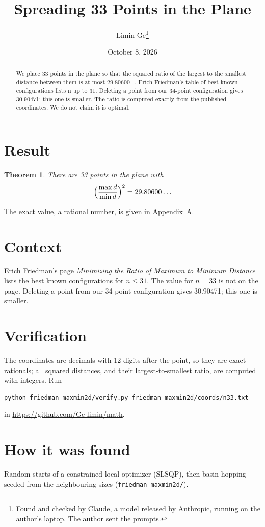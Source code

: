 \documentclass[11pt,a4paper]{article}
\title{Spreading 33 Points in the Plane}
\author{Limin Ge\thanks{Found and checked by Claude, a model released by Anthropic, running on the author's laptop. The author sent the prompts.}}
\date{October 8, 2026}
\newtheorem*{theorem}{Theorem}
\begin{document}
\maketitle
\begin{abstract}
We place 33 points in the plane so that the squared ratio of the largest to the smallest distance between them is at most 29.80600+. Erich Friedman's table of best known configurations lists n up to 31. Deleting a point from our 34-point configuration gives 30.90471; this one is smaller. The ratio is computed exactly from the published coordinates. We do not claim it is optimal.
\end{abstract}

\section{Result}
\begin{theorem}
There are 33 points in the plane with
\[ \Bigl(\frac{\max d}{\min d}\Bigr)^2 = 29.80600\ldots \]
\end{theorem}
The exact value, a rational number, is given in Appendix~A.


\section{Context}
Erich Friedman's page \emph{Minimizing the Ratio of Maximum to Minimum Distance} lists the best known configurations for $n\le 31$. The value for $n=33$ is not on the page. Deleting a point from our 34-point configuration gives 30.90471; this one is smaller.


\section{Verification}
The coordinates are decimals with 12 digits after the point, so they are exact rationals; all squared distances, and their largest-to-smallest ratio, are computed with integers. Run
\begin{verbatim}
python friedman-maxmin2d/verify.py friedman-maxmin2d/coords/n33.txt
\end{verbatim}
in \url{https://github.com/Ge-limin/math}.


\section{How it was found}
Random starts of a constrained local optimizer (SLSQP), then basin hopping seeded from the neighbouring sizes (\texttt{friedman-maxmin2d/}).
\end{document}
